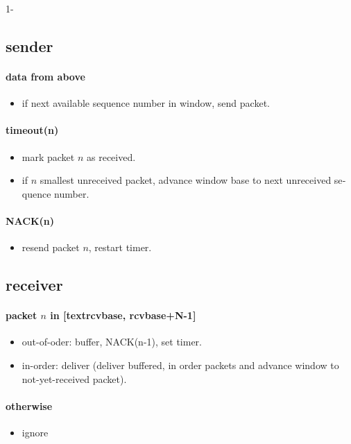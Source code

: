 1-

\begin{latin}
\subsection*{sender}
\paragraph{data from above}
	\begin{itemize}
		\item if next available sequence number in window, send packet.
	\end{itemize}

\paragraph{timeout(n)}
	\begin{itemize}
		\item mark packet $n$ as received.
		\item if $n$ smallest unreceived packet, advance window base to next unreceived sequence number.
	\end{itemize}

\paragraph{NACK(n)}
	\begin{itemize}
		\item resend packet $n$, restart timer.
	\end{itemize}	
	
\hline

\subsection*{receiver}
\paragraph{packet $n$ in [text{rcvbase, rcvbase}+N-1] }
\begin{itemize}
	\item out-of-oder: buffer, NACK(n-1), set timer.
	\item in-order: deliver
	(deliver buffered, in order packets and advance window to not-yet-received packet).
	
\end{itemize}

\paragraph{otherwise}
	\begin{itemize}
		\item ignore
	\end{itemize}


\end{latin}
